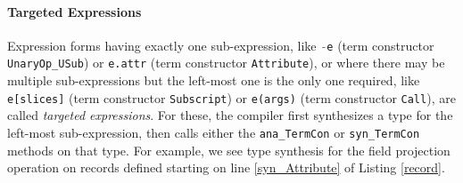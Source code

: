 \documentclass[9pt,preprint]{sigplanconf}
\newcommand{\lstinlinep}[1]{\lstinline[language=Python,basicstyle=\ttfamily\small]{#1}}
\begin{document}
\paragraph{Targeted Expressions} Expression forms having exactly one sub-expression, like \lstinlinep{-e} (term constructor \lstinlinep{UnaryOp_USub}) or \lstinlinep{e.attr} (term constructor \lstinlinep{Attribute}), or where there may be multiple sub-expressions but the left-most one is the only one required, like \lstinlinep{e[slices]} (term constructor  \lstinlinep{Subscript}) or \lstinlinep{e(args)} (term constructor \lstinlinep{Call}), are called \emph{targeted expressions}. For these, the compiler first synthesizes a type for the left-most sub-expression, then calls either the \lstinlinep{ana_TermCon} or \lstinlinep{syn_TermCon} methods on that type. For example, we see type synthesis for the field projection operation on records defined starting on line \ref{syn_Attribute} of Listing \ref{record}.%
\end{document}
